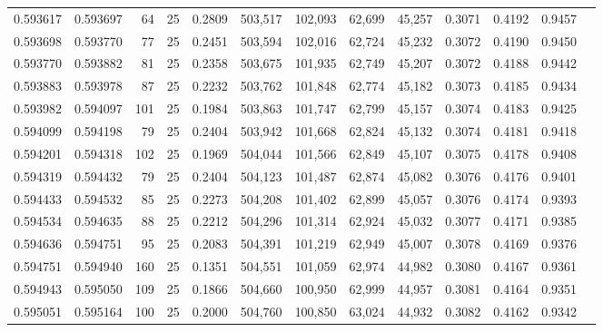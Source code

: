 \begin{tabular}{rrrrrrrrrrrrr}
0.593617 & 0.593697 &    64 &  25 &                                     0.2809 & 503,517 & 102,093 &  62,699 &  45,257 & 0.3071 & 0.4192 & 0.9457 \\
0.593698 & 0.593770 &    77 &  25 &                                     0.2451 & 503,594 & 102,016 &  62,724 &  45,232 & 0.3072 & 0.4190 & 0.9450 \\
0.593770 & 0.593882 &    81 &  25 &                                     0.2358 & 503,675 & 101,935 &  62,749 &  45,207 & 0.3072 & 0.4188 & 0.9442 \\
0.593883 & 0.593978 &    87 &  25 &                                     0.2232 & 503,762 & 101,848 &  62,774 &  45,182 & 0.3073 & 0.4185 & 0.9434 \\
0.593982 & 0.594097 &   101 &  25 &                                     0.1984 & 503,863 & 101,747 &  62,799 &  45,157 & 0.3074 & 0.4183 & 0.9425 \\
0.594099 & 0.594198 &    79 &  25 &                                     0.2404 & 503,942 & 101,668 &  62,824 &  45,132 & 0.3074 & 0.4181 & 0.9418 \\
0.594201 & 0.594318 &   102 &  25 &                                     0.1969 & 504,044 & 101,566 &  62,849 &  45,107 & 0.3075 & 0.4178 & 0.9408 \\
0.594319 & 0.594432 &    79 &  25 &                                     0.2404 & 504,123 & 101,487 &  62,874 &  45,082 & 0.3076 & 0.4176 & 0.9401 \\
0.594433 & 0.594532 &    85 &  25 &                                     0.2273 & 504,208 & 101,402 &  62,899 &  45,057 & 0.3076 & 0.4174 & 0.9393 \\
0.594534 & 0.594635 &    88 &  25 &                                     0.2212 & 504,296 & 101,314 &  62,924 &  45,032 & 0.3077 & 0.4171 & 0.9385 \\
0.594636 & 0.594751 &    95 &  25 &                                     0.2083 & 504,391 & 101,219 &  62,949 &  45,007 & 0.3078 & 0.4169 & 0.9376 \\
0.594751 & 0.594940 &   160 &  25 &                                     0.1351 & 504,551 & 101,059 &  62,974 &  44,982 & 0.3080 & 0.4167 & 0.9361 \\
0.594943 & 0.595050 &   109 &  25 &                                     0.1866 & 504,660 & 100,950 &  62,999 &  44,957 & 0.3081 & 0.4164 & 0.9351 \\
0.595051 & 0.595164 &   100 &  25 &                                     0.2000 & 504,760 & 100,850 &  63,024 &  44,932 & 0.3082 & 0.4162 & 0.9342 \\

\end{tabular}
